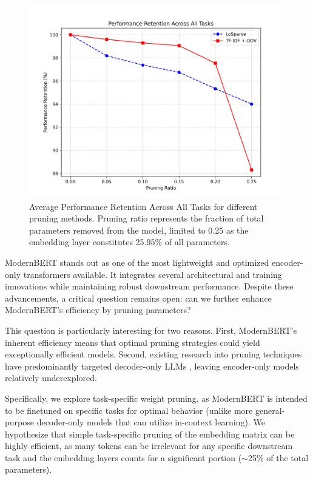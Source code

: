 \documentclass[twocolumn]{article}
\begin{document}
\begin{figure}[t]
\centering
\includegraphics[width=\columnwidth]{images/performance_retention.png}
\caption{Average Performance Retention Across All Tasks for different pruning methods. Pruning ratio represents the fraction of total parameters removed from the model, limited to 0.25 as the embedding layer constitutes 25.95\% of all parameters.}
\label{fig:pruning_retention}
\end{figure}

ModernBERT stands out as one of the most lightweight and optimized encoder-only transformers available. It integrates several architectural and training innovations while maintaining robust downstream performance. Despite these advancements, a critical question remains open: can we further enhance ModernBERT's efficiency by pruning parameters?

This question is particularly interesting for two reasons. First, ModernBERT's inherent efficiency means that optimal pruning strategies could yield exceptionally efficient models. Second, existing research into pruning techniques have predominantly targeted decoder-only LLMs \cite{namburi2023llm}, leaving encoder-only models relatively underexplored.

Specifically, we explore task-specific weight pruning, as ModernBERT is intended to be finetuned on specific tasks for optimal behavior (unlike more general-purpose decoder-only models that can utilize in-context learning). We hypothesize that simple task-specific pruning of the embedding matrix can be highly efficient, as many tokens can be irrelevant for any specific downstream task and the embedding layers counts for a significant portion ($\sim$25\% of the total parameters).
\end{document}
